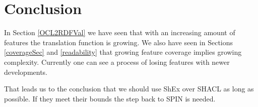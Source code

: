 \documentclass[runningheads]{llncs}
\begin{document}
\section{Conclusion}
In Section \ref{OCL2RDFVal} we have seen that with an increasing amount of features the translation function is growing.
We also have seen in Sections \ref{coverageSec} and \ref{readability} that growing feature coverage implies growing complexity.
Currently one can see a process of losing features with newer developments.

That leads us to the conclusion that we should use ShEx over SHACL as long as possible.
If they meet their bounds the step back to SPIN is needed.


\end{document}
